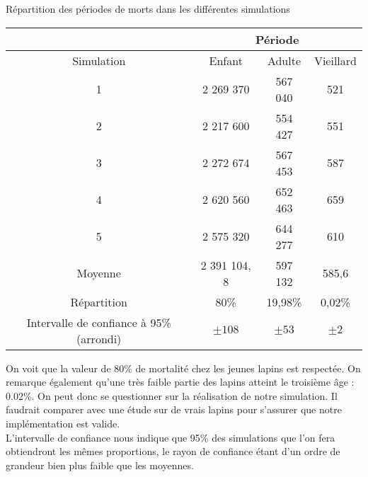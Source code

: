 \documentclass[11)pt,a4paper]{article}
\begin{document}
            \begin{center}
                Répartition des périodes de morts dans les différentes simulations
                \par
                \begin{tabular}{|c|c|c|c|}
                    \hline
                     & \multicolumn{3}{c|}{Période} \\
                    \hline
                    Simulation & Enfant & Adulte & Vieillard\\
                    \hline
                    1 & 2 269 370 & 567 040 & 521 \\
                    \hline
                    2 & 2 217 600 & 554 427 & 551 \\
                    \hline
                    3 & 2 272 674 & 567 453 & 587 \\
                    \hline
                    4 & 2 620 560 & 652 463 & 659 \\
                    \hline
                    5 & 2 575 320 & 644 277 & 610 \\
                    \hline
                    Moyenne & 2 391 104, 8 & 597 132 & 585,6 \\
                    \hline
                    Répartition & 80\% & 19,98\% & 0,02\% \\
                    \hline
                    Intervalle de confiance à 95\% (arrondi) & $\pm108$ & $\pm53$ & $\pm2$\\
                    \hline
                \end{tabular} 
            \end{center}
            On voit que la valeur de 80\% de mortalité chez les jeunes lapins est respectée. On remarque également qu'une très faible partie des lapins atteint le troisième âge : 0.02\%. 
            On peut donc se questionner sur la réalisation de notre simulation. Il faudrait comparer avec une étude sur de vrais lapins pour s'assurer que notre implémentation est valide.\\
            L'intervalle de confiance nous indique que 95\% des simulations que l'on fera obtiendront les mêmes proportions, le rayon de confiance étant d'un ordre de grandeur bien plus faible que les moyennes.
\end{document}
